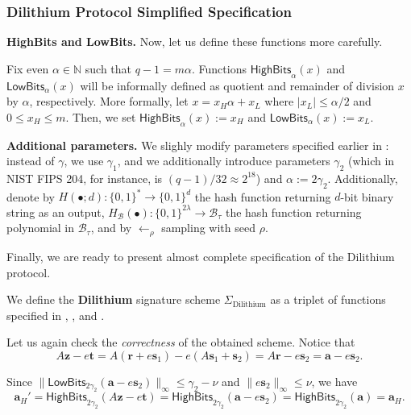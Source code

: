 \documentclass{template}
\begin{document}
\subsubsection{Dilithium Protocol Simplified Specification}

\textbf{HighBits and LowBits.} Now, let us define these functions 
more carefully.
\begin{definition}
    Fix even $\alpha \in \mathbb{N}$ such that $q-1=m\alpha$. Functions
    $\mathsf{HighBits}_{\alpha}(x)$ and $\mathsf{LowBits}_{\alpha}(x)$ will be
    informally defined as quotient and remainder of division $x$ by $\alpha$,
    respectively. More formally, let $x = x_H\alpha+x_L$ where $|x_L| \leq
    \alpha/2$ and $0 \leq x_H \leq m$. Then, we set
    $\mathsf{HighBits}_{\alpha}(x) := x_H$ and $\mathsf{LowBits}_{\alpha}(x) :=
    x_L$.
\end{definition}

\textbf{Additional parameters.} We slighly modify parameters specified earlier
in : instead of $\gamma$, we use $\gamma_1$, and we
additionally introduce parameters $\gamma_2$ (which in NIST FIPS 204, for
instance, is $(q-1)/32 \approx 2^{18}$) and $\alpha := 2\gamma_2$. Additionally,
denote by $H(\bullet;d): \{0,1\}^* \to \{0,1\}^d$ the hash function returning
$d$-bit binary string as an output, $H_{\mathcal{B}}(\bullet): \{0,1\}^{2\lambda} \to
\mathcal{B}_{\tau}$ the hash function returning polynomial in
$\mathcal{B}_{\tau}$, and by $\gets_{\rho}$ sampling with seed $\rho$.

Finally, we are ready to present almost complete specification of the Dilithium
protocol.

\begin{definition}
    We define the \textbf{Dilithium} signature scheme
    $\Sigma_{\text{Dilithium}}$ as a triplet of functions specified in
    , , and
    .
\end{definition}

Let us again check the \textit{correctness} of the obtained scheme. Notice that
\begin{equation*}
    A\mathbf{z} - e\mathbf{t} = A(\mathbf{r}+e\mathbf{s}_1) - e(A\mathbf{s}_1+\mathbf{s}_2) = A\mathbf{r} - e\mathbf{s}_2 = \mathbf{a} - e\mathbf{s}_2.
\end{equation*}

Since $\|\mathsf{LowBits}_{2\gamma_2}(\mathbf{a}-e\mathbf{s}_2)\|_{\infty} \leq
\gamma_2 - \nu$ and $\|e\mathbf{s}_2\|_{\infty} \leq \nu$, we have
\begin{equation*}
    \mathbf{a}_H' = \mathsf{HighBits}_{2\gamma_2}(A\mathbf{z}-e\mathbf{t}) = \mathsf{HighBits}_{2\gamma_2}(\mathbf{a}-e\mathbf{s}_2) = \mathsf{HighBits}_{2\gamma_2}(\mathbf{a}) = \mathbf{a}_H.
\end{equation*}
\end{document}
